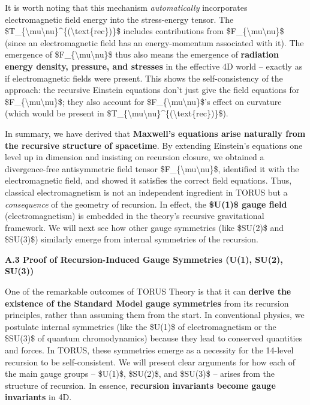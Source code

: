 \documentclass[
]{article}
\begin{document}
It is worth noting that this mechanism \emph{automatically} incorporates
electromagnetic field energy into the stress-energy tensor. The
\$T\_\{\textbackslash mu\textbackslash nu\}\^{}\{(\textbackslash text\{rec\})\}\$
includes contributions from
\$F\_\{\textbackslash mu\textbackslash nu\}\$ (since an electromagnetic
field has an energy-momentum associated with it). The emergence of
\$F\_\{\textbackslash mu\textbackslash nu\}\$ thus also means the
emergence of \textbf{radiation energy density, pressure, and stresses}
in the effective 4D world -- exactly as if electromagnetic fields were
present. This shows the self-consistency of the approach: the recursive
Einstein equations don't just give the field equations for
\$F\_\{\textbackslash mu\textbackslash nu\}\$; they also account for
\$F\_\{\textbackslash mu\textbackslash nu\}\$'s effect on curvature
(which would be present in
\$T\_\{\textbackslash mu\textbackslash nu\}\^{}\{(\textbackslash text\{rec\})\}\$).

In summary, we have derived that \textbf{Maxwell's equations arise
naturally from the recursive structure of spacetime}. By extending
Einstein's equations one level up in dimension and insisting on
recursion closure, we obtained a divergence-free antisymmetric field
tensor \$F\_\{\textbackslash mu\textbackslash nu\}\$, identified it with
the electromagnetic field, and showed it satisfies the correct field
equations\hspace{0pt}. Thus, classical electromagnetism is not an
independent ingredient in TORUS but a \emph{consequence} of the geometry
of recursion. In effect, the \textbf{\$U(1)\$ gauge field}
(electromagnetism) is embedded in the theory's recursive gravitational
framework\hspace{0pt}. We will next see how other gauge symmetries (like
\$SU(2)\$ and \$SU(3)\$) similarly emerge from internal symmetries of
the recursion.

\textbf{A.3 Proof of Recursion-Induced Gauge Symmetries (U(1), SU(2),
SU(3))}

One of the remarkable outcomes of TORUS Theory is that it can
\textbf{derive the existence of the Standard Model gauge symmetries}
from its recursion principles, rather than assuming them from the start.
In conventional physics, we postulate internal symmetries (like the
\$U(1)\$ of electromagnetism or the \$SU(3)\$ of quantum chromodynamics)
because they lead to conserved quantities and forces. In TORUS, these
symmetries emerge as a necessity for the 14-level recursion to be
self-consistent\hspace{0pt}. We will present clear arguments for how
each of the main gauge groups -- \$U(1)\$, \$SU(2)\$, and \$SU(3)\$ --
arises from the structure of recursion. In essence, \textbf{recursion
invariants become gauge invariants} in 4D.
\end{document}
